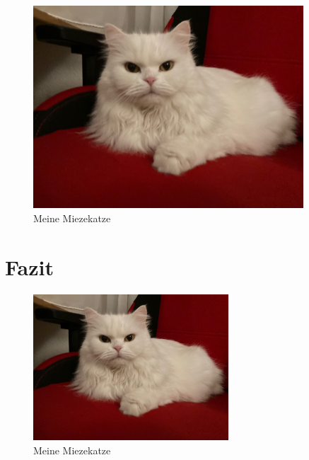 \documentclass[12pt,ngerman,parskip=half]{scrreprt}
\begin{document}
\begin{figure}[h]
\begin{center}
\includegraphics[width=0.9\textwidth]{Bilder/Katze}
\caption{Meine Miezekatze}\label{fig:katze}
\end{center}
\end{figure}


\blindtext[2]

\section{Fazit}\label{sec:fazit}

\blindtext[2]


\begin{figure}[h]
\begin{center}
\includegraphics[width=0.65\textwidth,angle=90]{Bilder/Katze}
\caption{Meine Miezekatze}\label{fig:katze}
\end{center}
\end{figure}


\blindtext[2]
\end{document}
